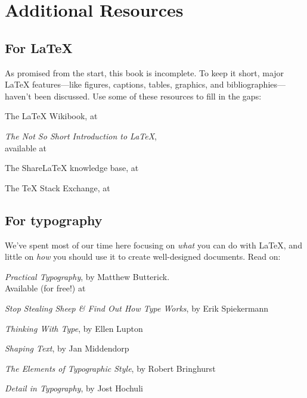 \setlength\parskip{0.55\baselineskip}
\setlength\parindent{0pt}

\chapter{Additional Resources}
\label{resources}

\section{For \texorpdfstring{\LaTeX}{LaTeX}}

As promised from the start, this book is incomplete.
To keep it short,
major \LaTeX{} features---like figures, captions, tables, graphics,
and bibliographies---haven't been discussed.
Use some of these resources to fill in the gaps:
\begin{leftfigure}
The \LaTeX{} Wikibook, at 

\textit{The Not So Short Introduction to \LaTeX}, \\
available at 

The Share\LaTeX{} knowledge base, at 

The \TeX{} Stack Exchange, at 
\end{leftfigure}

\section{For typography}

We've spent most of our time here focusing on \emph{what} you can do with \LaTeX,
and little on \emph{how} you should use it to create well-designed documents.
Read on:
\begin{leftfigure}
\textit{Practical Typography}, by Matthew Butterick. \\
Available (for free!) at 

\textit{Stop Stealing Sheep \& Find Out How Type Works}, by Erik Spiekermann

\textit{Thinking With Type}, by Ellen Lupton

\textit{Shaping Text}, by Jan Middendorp

\textit{The Elements of Typographic Style}, by Robert Bringhurst

\textit{Detail in Typography}, by Jost Hochuli
\end{leftfigure}

